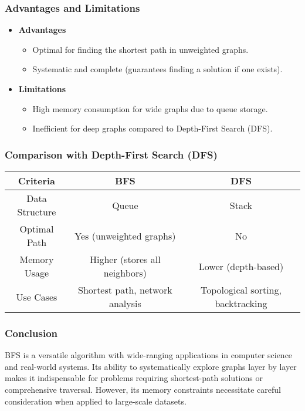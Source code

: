 \subsubsection{Advantages and Limitations}
\begin{itemize}

	\item \textbf{Advantages}
	      \begin{itemize}
		      \item Optimal for finding the shortest path in unweighted graphs.
		      \item Systematic and complete (guarantees finding a solution if one exists).
	      \end{itemize}

	\item \textbf{Limitations}
	      \begin{itemize}
		      \item High memory consumption for wide graphs due to queue storage.
		      \item Inefficient for deep graphs compared to Depth-First Search (DFS).
	      \end{itemize}

\end{itemize}
\subsubsection{Comparison with Depth-First Search (DFS)}
\begin{center}
	\begin{tabular}{|c|c|c|}
		\hline
		\textbf{Criteria} & \textbf{BFS}                    & \textbf{DFS}                      \\
		\hline
		Data Structure    & Queue                           & Stack                             \\
		\hline
		Optimal Path      & Yes (unweighted graphs)         & No                                \\
		\hline
		Memory Usage      & Higher (stores all neighbors)   & Lower (depth-based)               \\
		\hline
		Use Cases         & Shortest path, network analysis & Topological sorting, backtracking \\
		\hline
	\end{tabular}
\end{center}

\subsubsection{Conclusion}
BFS is a versatile algorithm with wide-ranging applications in computer science and real-world systems. Its ability to systematically explore graphs layer by layer makes it indispensable for problems requiring shortest-path solutions or comprehensive traversal. However, its memory constraints necessitate careful consideration when applied to large-scale datasets.

